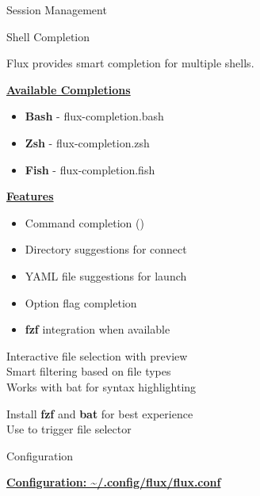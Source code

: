 \documentclass[10pt,a4paper]{article}
\begin{document}
\begin{multicols}{3}
\begin{textbox}{Session Management}
\end{textbox}

\begin{textbox}{Shell Completion}

Flux provides smart completion for multiple shells.

\underline{\textbf{Available Completions}}
\begin{itemize}
    \item \textbf{Bash} - flux-completion.bash
    \item \textbf{Zsh} - flux-completion.zsh  
    \item \textbf{Fish} - flux-completion.fish
\end{itemize}

\underline{\textbf{Features}}
\begin{itemize}
    \item Command completion ()
    \item Directory suggestions for connect
    \item YAML file suggestions for launch
    \item Option flag completion
    \item \textbf{fzf} integration when available
\end{itemize}


Interactive file selection with preview\\

Smart filtering based on file types\\

Works with bat for syntax highlighting\\


Install \textbf{fzf} and \textbf{bat} for best experience\\

Use   to trigger file selector\\

\end{textbox}

\begin{textbox}{Configuration}

\underline{\textbf{Configuration: \textasciitilde/.config/flux/flux.conf}}




\end{textbox}
\end{multicols}
\end{document}
